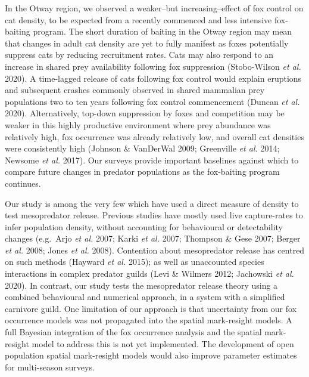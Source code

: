 \documentclass[11pt,a4paper,titlepage,twoside,openright]{style/unimelbthesis}
\begin{document}
\begin{mainmatter}
In the Otway region, we observed a weaker--but increasing--effect of fox control on cat density, to be expected from a recently commenced and less intensive fox-baiting program. The short duration of baiting in the Otway region may mean that changes in adult cat density are yet to fully manifest as foxes potentially suppress cats by reducing recruitment rates. Cats may also respond to an increase in shared prey availability following fox suppression (Stobo-Wilson \emph{et al.} 2020). A time-lagged release of cats following fox control would explain eruptions and subsequent crashes commonly observed in shared mammalian prey populations two to ten years following fox control commencement (Duncan \emph{et al.} 2020). Alternatively, top-down suppression by foxes and competition may be weaker in this highly productive environment where prey abundance was relatively high, fox occurrence was already relatively low, and overall cat densities were consistently high (Johnson \& VanDerWal 2009; Greenville \emph{et al.} 2014; Newsome \emph{et al.} 2017). Our surveys provide important baselines against which to compare future changes in predator populations as the fox-baiting program continues.

Our study is among the very few which have used a direct measure of density to test mesopredator release. Previous studies have mostly used live capture-rates to infer population density, without accounting for behavioural or detectability changes (e.g.~Arjo \emph{et al.} 2007; Karki \emph{et al.} 2007; Thompson \& Gese 2007; Berger \emph{et al.} 2008; Jones \emph{et al.} 2008). Contention about mesopredator release has centred on such methods (Hayward \emph{et al.} 2015); as well as unaccounted species interactions in complex predator guilds (Levi \& Wilmers 2012; Jachowski \emph{et al.} 2020). In contrast, our study tests the mesopredator release theory using a combined behavioural and numerical approach, in a system with a simplified carnivore guild. One limitation of our approach is that uncertainty from our fox occurrence models was not propagated into the spatial mark-resight models. A full Bayesian integration of the fox occurrence analysis and the spatial mark-resight model to address this is not yet implemented. The development of open population spatial mark-resight models would also improve parameter estimates for multi-season surveys.


\end{mainmatter}
\end{document}
